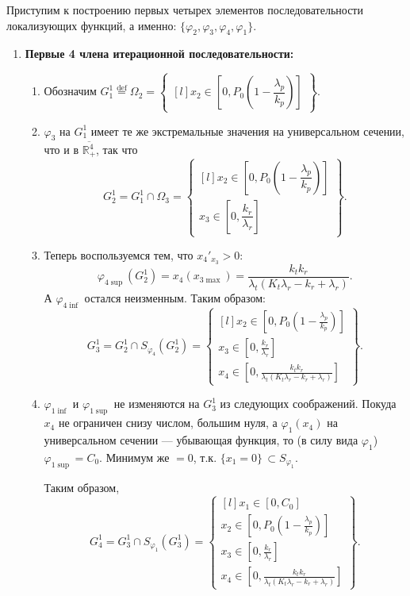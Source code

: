 \documentclass[12pt,a4paper]{article}
\newcommand{\eqdef}{\stackrel{\text{def}}{=}}
\newcommand{\xin}[3]{x_{#1} \in \left[ #2, #3 \right]}
\newcommand{\set}[1]{
    \left\{ \begin{matrix*}[l] #1 \end{matrix*}     
    \right\}   
    }
\begin{document}
Приступим к построению первых четырех элементов последовательности локализующих функций, а именно: $\{\varphi_2, \varphi_3, \varphi_4, \varphi_1\}$.

\begin{enumerate}
    
    \item \textbf{Первые 4 члена итерационной последовательности:}

    \begin{enumerate}
        
        \item Обозначим $ G_1^1 \eqdef \Omega_2 =
            \set{\xin{2}{0}{P_0\left( 1 - \dfrac{\lambda_p}{k_p} \right)}} $. 

        \item $\varphi_3$ на $G_1^1$ имеет те же экстремальные значения на универсальном сечении, что и в $\overline{\mathbb{R}_{+}^{4}}$, так что
        $$G_2^1 = G_1^1 \cap \Omega_3 = \set{
            \xin{2}{0}{P_0\left( 1 - \dfrac{\lambda_p}{k_p} \right)} \\
            \xin{3}{0}{\dfrac{k_r}{\lambda_r}}
        }.
        $$

        \item Теперь воспользуемся тем, что ${x_4}'_{x_3} > 0:$ 
        $$\varphi_{4 \sup}(G_2^1) = x_4(x_{3 \max}) = 
            \dfrac{k_t k_r}{\lambda_t(K_t \lambda_r - k_r + \lambda_r)}.
        $$
        А $\varphi_{4 \inf}$ остался неизменным. Таким образом:
        $$G_3^1 = G_2^1 \cap S_{\varphi_4}(G_2^1) = \set{
            \xin{2}{0}{P_0\left( 1 - \frac{\lambda_p}{k_p} \right)} \\
            \xin{3}{0}{\frac{k_r}{\lambda_r}} \\
            \xin{4}{0}{\frac{k_t k_r}{\lambda_t(K_t \lambda_r - k_r + \lambda_r)}}
        }.
        $$

        \item $\varphi_{1 \inf}$ и $\varphi_{1 \sup}$ не изменяются на $G_3^1$ из следующих соображений. Покуда $x_4$ не ограничен снизу числом, большим нуля, а $\varphi_{1}(x_4)$ на универсальном сечении --- убывающая функция, то (в силу вида $\varphi_{1}$) $\varphi_{1 \sup} = C_0$. Минимум же $= 0$, т.к. $\{x_1 = 0\}\,\subset S_{\varphi_1}$.
        
        Таким образом, 
        $$G_4^1 = G_3^1 \cap S_{\varphi_1}(G_3^1) = \set{
            \xin{1}{0}{ C_0 } \\
            \xin{2}{0}{P_0\left( 1 - \frac{\lambda_p}{k_p} \right)} \\
            \xin{3}{0}{\frac{k_r}{\lambda_r}} \\
            \xin{4}{0}{\frac{k_t k_r}{\lambda_t(K_t \lambda_r - k_r + \lambda_r)}}
        }.
        $$
    \end{enumerate}
    

\end{enumerate}
\end{document}
